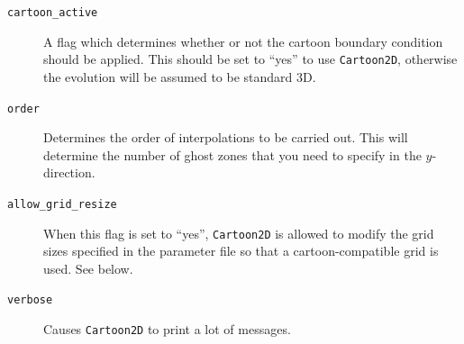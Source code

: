 \documentclass{article}
\begin{document}
\begin{description}

  \item[\texttt{cartoon\_active}] A flag which determines whether or
  not the cartoon boundary condition should be applied. This should be
  set to ``yes'' to use \texttt{Cartoon2D}, otherwise the evolution
  will be assumed to be standard 3D.

  \item[\texttt{order}] Determines the order of interpolations to be
  carried out. This will determine the number of ghost zones that you
  need to specify in the $y$-direction.

  \item[\texttt{allow\_grid\_resize}] When this flag is set to
  ``yes'', \texttt{Cartoon2D} is allowed to modify the grid sizes
  specified in the parameter file so that a cartoon-compatible grid is
  used. See below.

  \item[\texttt{verbose}] Causes \texttt{Cartoon2D} to print a lot of
  messages.

%
%

\end{description}
\end{document}
